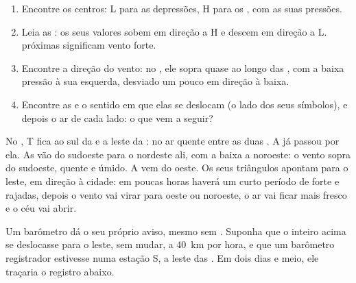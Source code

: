 \begin{method}
\begin{enumerate}
  \item Encontre os centros: L para as depressões, H para os
        , com as suas pressões.
  \item Leia as : os seus valores sobem em direção a H e descem
        em direção a L.  próximas significam vento forte.
  \item Encontre a direção do vento: no , ele sopra quase
        ao longo das , com a baixa pressão à sua esquerda,
        desviado um pouco em direção à baixa.
  \item Encontre as  e o sentido em que elas se deslocam (o lado
        dos seus símbolos), e depois o ar de cada lado: o que vem a
        seguir?
\end{enumerate}
\end{method}

\begin{example}
No , T fica ao sul da  e a leste da : no ar
quente entre as duas . A  já passou por ela. As
 vão do sudoeste para o nordeste ali, com a baixa a noroeste: o
vento sopra do sudoeste, quente e úmido. A  vem do oeste. Os
seus triângulos apontam para o leste, em direção à cidade: em poucas
horas haverá um curto período de  forte e rajadas, depois o vento
vai virar para oeste ou noroeste, o ar vai ficar mais fresco e o céu vai
abrir.
\end{example}

Um barômetro dá o seu próprio aviso, mesmo sem . Suponha que o 
inteiro acima se deslocasse para o leste, sem mudar, a \qty{40}{km} por
hora, e que um barômetro registrador estivesse numa estação S, a leste das
. Em dois dias e meio, ele traçaria o registro abaixo.


